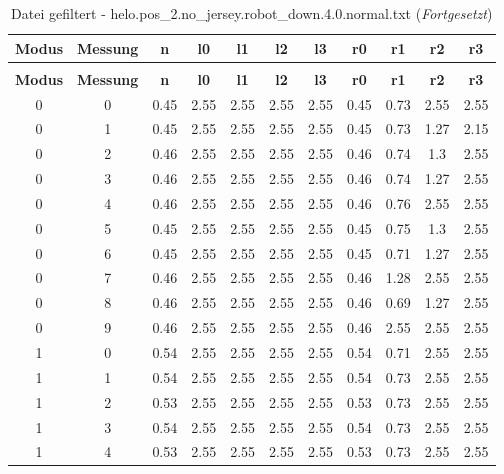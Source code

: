 \begin{longtable}{|c|c||c||c|c|c|c||c|c|c|c|}
	\caption{Datei gefiltert - helo.pos\_2.no\_jersey.robot\_down.4.0.normal.txt} \label{tab:helo.pos-2.no-jersey.robot-down.4.0.normal.txt} \\ \hline
	\textbf{Modus} & \textbf{Messung} & \textbf{n} & \textbf{l0} & \textbf{l1} & \textbf{l2} & \textbf{l3} & \textbf{r0} & \textbf{r1} & \textbf{r2} & \textbf{r3}\\ \hline
	\endfirsthead
	\caption[]{Datei gefiltert - helo.pos\_2.no\_jersey.robot\_down.4.0.normal.txt (\emph{Fortgesetzt})} \\ \hline
	\textbf{Modus} & \textbf{Messung} & \textbf{n} & \textbf{l0} & \textbf{l1} & \textbf{l2} & \textbf{l3} & \textbf{r0} & \textbf{r1} & \textbf{r2} & \textbf{r3}\\ \hline
	\endhead
	0 & 0 & 0.45 & 2.55 & 2.55 & 2.55 & 2.55 & 0.45 & 0.73 & 2.55 & 2.55 \\ \hline
	0 & 1 & 0.45 & 2.55 & 2.55 & 2.55 & 2.55 & 0.45 & 0.73 & 1.27 & 2.15 \\ \hline
	0 & 2 & 0.46 & 2.55 & 2.55 & 2.55 & 2.55 & 0.46 & 0.74 & 1.3 & 2.55 \\ \hline
	0 & 3 & 0.46 & 2.55 & 2.55 & 2.55 & 2.55 & 0.46 & 0.74 & 1.27 & 2.55 \\ \hline
	0 & 4 & 0.46 & 2.55 & 2.55 & 2.55 & 2.55 & 0.46 & 0.76 & 2.55 & 2.55 \\ \hline
	0 & 5 & 0.45 & 2.55 & 2.55 & 2.55 & 2.55 & 0.45 & 0.75 & 1.3 & 2.55 \\ \hline
	0 & 6 & 0.45 & 2.55 & 2.55 & 2.55 & 2.55 & 0.45 & 0.71 & 1.27 & 2.55 \\ \hline
	0 & 7 & 0.46 & 2.55 & 2.55 & 2.55 & 2.55 & 0.46 & 1.28 & 2.55 & 2.55 \\ \hline
	0 & 8 & 0.46 & 2.55 & 2.55 & 2.55 & 2.55 & 0.46 & 0.69 & 1.27 & 2.55 \\ \hline
	0 & 9 & 0.46 & 2.55 & 2.55 & 2.55 & 2.55 & 0.46 & 2.55 & 2.55 & 2.55 \\ \hline
	1 & 0 & 0.54 & 2.55 & 2.55 & 2.55 & 2.55 & 0.54 & 0.71 & 2.55 & 2.55 \\ \hline
	1 & 1 & 0.54 & 2.55 & 2.55 & 2.55 & 2.55 & 0.54 & 0.73 & 2.55 & 2.55 \\ \hline
	1 & 2 & 0.53 & 2.55 & 2.55 & 2.55 & 2.55 & 0.53 & 0.73 & 2.55 & 2.55 \\ \hline
	1 & 3 & 0.54 & 2.55 & 2.55 & 2.55 & 2.55 & 0.54 & 0.73 & 2.55 & 2.55 \\ \hline
	1 & 4 & 0.53 & 2.55 & 2.55 & 2.55 & 2.55 & 0.53 & 0.73 & 2.55 & 2.55 \\ \hline

\end{longtable}

